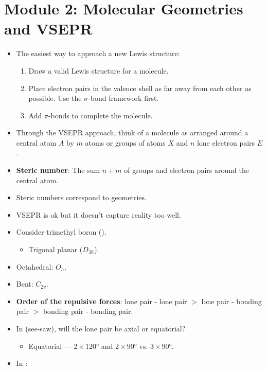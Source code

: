 \documentclass[../notes.tex]{subfiles}
\begin{document}
\section{Module 2: Molecular Geometries and VSEPR}
\begin{itemize}
    \item The easiest way to approach a new Lewis structure:
    \begin{enumerate}
        \item Draw a valid Lewis structure for a molecule.
        \item Place electron pairs in the valence shell as far away from each other as possible. Use the $\sigma$-bond framework first.
        \item Add $\pi$-bonds to complete the molecule.
    \end{enumerate}
    \item Through the VSEPR approach, think of a molecule as arranged around a central atom $A$ by $m$ atoms or groups of atoms $X$ and $n$ lone electron pairs $E$.
    \item \textbf{Steric number}: The sum $n+m$ of groups and electron pairs around the central atom.
    \item Steric numbers correspond to geometries.
    \item VSEPR is ok but it doesn't capture reality too well.
    \item Consider trimethyl boron ().
    \begin{itemize}
        \item Trigonal planar ($D_{3h}$).
    \end{itemize}
    \item Octahedral: $O_h$.
    \item Bent: $C_{2v}$.
    \item \textbf{Order of the repulsive forces}: lone pair - lone pair $>$ lone pair - bonding pair $>$ bonding pair - bonding pair.
    \item In  (see-saw), will the lone pair be axial or equatorial?
    \begin{itemize}
        \item Equatorial --- $2\times\ang{120}$ and $2\times\ang{90}$ vs. $3\times\ang{90}$.
    \end{itemize}
    \item In :
    \begin{figure}[h!]
        \centering
        \begin{subfigure}[b]{0.2\linewidth}
            \centering

\end{subfigure}
\end{figure}
\end{itemize}
\end{document}
